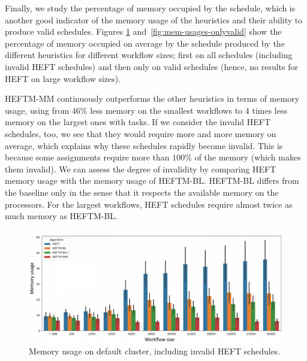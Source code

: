 \documentclass[conference]{IEEEtran}
\newcommand{\algo}[1]{\textsc{#1}}
\newcommand{\heft}{\algo{HEFT}\xspace}
\newcommand{\heftmm}{\algo{HEFTM-MM}\xspace}
\newcommand{\heftbl}{\algo{HEFTM-BL}\xspace}
\begin{document}

Finally, we study the percentage of memory occupied by the schedule, which is another good indicator
of the memory usage of the heuristics and their ability to produce valid schedules.  %
Figures \ref{fig:mem-usages-normal} and~\ref{fig:mem-usages-onlyvalid} show the percentage of memory
occupied on average by the schedule
produced by the different heuristics for different workflow sizes;
first on all schedules (including invalid \heft schedules) and then only on 
valid schedules (hence, no results for \heft on large workflow sizes).
%


\heftmm continuously outperforms the other heuristics in terms of memory usage,
using from $46\%$ less memory on the smallest
workflows to $4$ times less memory on the largest ones with  tasks.
If we consider the invalid \heft schedules, too, we see that they would require more and more memory on average,
which explains why these schedules rapidly become invalid.
This is because some assignments require more than $100\%$ of the memory (which makes them invalid).
We can assess the degree of invalidity by comparing \heft memory usage with the memory usage of \heftbl.
\heftbl differs from the baseline only in the sense that it respects the available memory on the processors.
For the largest workflows, \heft schedules require almost twice as much memory as \heftbl.

\begin{figure}[tb]
    \centering
    \includegraphics[width=1\columnwidth] {images/mem-usage-normal2}
    \caption{Memory usage on default cluster, including invalid \heft schedules. }
     \label{fig:mem-usages-normal}
\end{figure}
\end{document}
